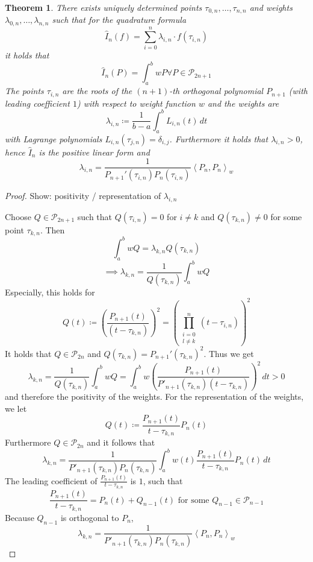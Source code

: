 \documentclass[a4paper]{article}
\newcounter{lecref}[section]
\numberwithin{lecref}{section}
\theoremstyle{break}
\newtheorem{thm}[lecref]{Theorem}
\newcommand{\IP}[2]{\left\langle#1, #2\right\rangle}
\begin{document}
\begin{thm}
  \label{theorem:5-13}
  There exists uniquely determined points $\tau_{0,n}, \dots, \tau_{n,n}$ and weights $\lambda_{0,n}, \dots, \lambda_{n,n}$ such that for the quadrature formula
  \[ \hat{I}_n(f) = \sum_{i=0}^n \lambda_{i,n} \cdot f(\tau_{i,n}) \]
  it holds that
  \[ \hat{I}_n(P) = \int_a^b wP \forall P \in \mathcal P_{2n+1} \]
  The points $\tau_{i,n}$ are the roots of the $(n+1)$-th orthogonal polynomial $P_{n+1}$ (with leading coefficient $1$) with respect to weight function $w$ and the weights are
  \[ \lambda_{i,n} \coloneqq \frac{1}{b-a} \int_a^b L_{i,n}(t) \, dt \]
  with Lagrange polynomials $L_{i,n}(\tau_{j,n}) = \delta_{i,j}$. Furthermore it holds that $\lambda_{i,n} > 0$, hence $\hat{I}_n$ is the positive linear form and
  \[ \lambda_{i,n} = \frac{1}{P_{n+1}'(\tau_{i,n}) P_n(\tau_{i,n})} \IP{P_n}{P_n}_w \]
\end{thm}

\begin{proof}
  Show: positivity / representation of $\lambda_{i,n}$

  Choose $Q \in \mathcal P_{2n+1}$ such that $Q(\tau_{i,n}) = 0$ for $i \neq k$ and $Q(\tau_{k,n}) \neq 0$ for some point $\tau_{k,n}$. Then
  \[ \int_a^b w Q = \lambda_{k,n} Q(\tau_{k,n}) \]
  \[ \implies \lambda_{k,n} = \frac{1}{Q(\tau_{k,n})} \int_a^b wQ \]
  Especially, this holds for
  \[ Q(t) \coloneqq \left(\frac{P_{n+1}(t)}{(t - \tau_{k,n})}\right)^2 = \left(\prod_{\substack{i = 0 \\ l \neq k}}^n (t - \tau_{i,n})\right)^2 \]
  It holds that $Q \in \mathcal P_{2n}$ and $Q(\tau_{k,n}) = P_{n+1}'(\tau_{k,n})^2$.
  Thus we get
  \[ \lambda_{k,n} = \frac{1}{Q(\tau_{k,n})} \int_a^b wQ = \int_a^b w \left(\frac{P_{n+1}(t)}{P'_{n+1}(\tau_{k,n}) (t - \tau_{k,n})}\right)^2 \, dt > 0 \]
  and therefore the positivity of the weights. For the representation of the weights, we let
  \[ Q(t) \coloneqq \frac{P_{n+1}(t)}{t - \tau_{k,n}} P_n(t) \]
  Furthermore $Q \in \mathcal P_{2n}$ and it follows that
  \[ \lambda_{k,n} = \frac{1}{P'_{n+1}(\tau_{k,n}) P_n(\tau_{k,n})} \int_a^b w(t) \frac{P_{n+1}(t)}{t - \tau_{k,n}} P_n(t) \, dt \]
  The leading coefficient of $\frac{P_{n+1}(t)}{t - \tau_{k,n}}$ is $1$, such that
  \[ \frac{P_{n+1}(t)}{t - \tau_{k,n}} = P_n(t) + Q_{n-1}(t) \text{ for some } Q_{n-1} \in \mathcal P_{n-1} \]
  Because $Q_{n-1}$ is orthogonal to $P_n$,
  \[ \lambda_{k,n} = \frac{1}{P'_{n+1}(\tau_{k,n}) P_n(\tau_{k,n})} \IP{P_n}{P_n}_w \]
\end{proof}
\end{document}
